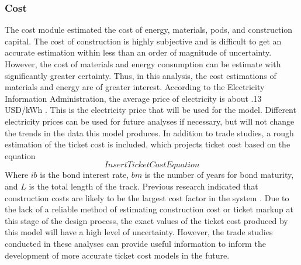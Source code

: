 \subsubsection{Cost}
The cost module estimated the cost of energy, materials, pods, and construction capital. The cost of construction is highly subjective and is difficult to get an accurate estimation within less than an order of magnitude of uncertainty. However, the cost of materials and energy consumption can be estimate with significantly greater certainty. Thus, in this analysis, the cost estimations of materials and energy are of greater interest. According to the Electricity Information Administration, the average price of electricity is about .13 USD/kWh \cite{EIA}. This is the electricity price that will be used for the model. Different electricity prices can be used for future analyses if necessary, but will not change the trends in the data this model produces. In addition to trade studies, a rough estimation of the ticket cost is included, which projects ticket cost based on the equation 
\begin{equation}
	\label{eq:ticket_cost}
	Insert Ticket Cost Equation
\end{equation}
Where $ib$ is the bond interest rate, $bm$ is the number of years for bond maturity, and $L$ is the total length of the track. Previous research indicated that construction costs are likely to be the largest cost factor in the system \cite{Musk}. Due to the lack of a reliable method of estimating construction cost or ticket markup at this stage of the design process, the exact values of the ticket cost produced by this model will have a high level of uncertainty. However, the trade studies conducted in these analyses can provide useful information to inform the development of more accurate ticket cost models in the future.